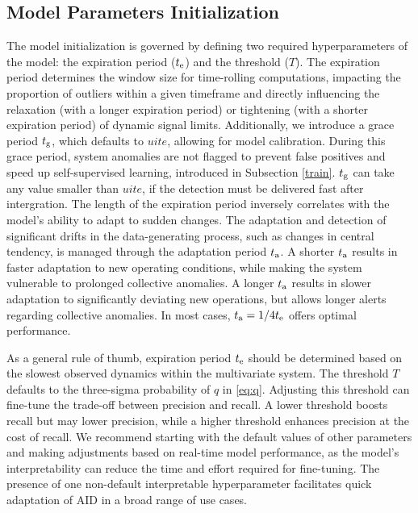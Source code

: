 \subsection{Model Parameters Initialization}\label{init}
The model initialization is governed by defining two required hyperparameters of the model: the expiration period ($t _{\text{e}}$) and the threshold ($T$). The expiration period determines the window size for time-rolling computations, impacting the proportion of outliers within a given timeframe and directly influencing the relaxation (with a longer expiration period) or tightening (with a shorter expiration period) of dynamic signal limits. Additionally, we introduce a grace period $t _{\text{g}}$, which defaults to $ui{t}{e}$, allowing for model calibration. During this grace period, system anomalies are not flagged to prevent false positives and speed up self-supervised learning, introduced in Subsection \ref{train}. $t _{\text{g}}$ can take any value smaller than $ui{t}{e}$, if the detection must be delivered fast after intergration. The length of the expiration period inversely correlates with the model's ability to adapt to sudden changes. The adaptation and detection of significant drifts in the data-generating process, such as changes in central tendency, is managed through the adaptation period $t _{\text{a}}$. A shorter $t _{\text{a}}$ results in faster adaptation to new operating conditions, while making the system vulnerable to prolonged collective anomalies. A longer $t _{\text{a}}$ results in slower adaptation to significantly deviating new operations, but allows longer alerts regarding collective anomalies. In most cases, $t _{\text{a}} = 1/4t _{\text{e}}$ offers optimal performance.

As a general rule of thumb, expiration period $t _{\text{e}}$ should be determined based on the slowest observed dynamics within the multivariate system. The threshold $T$ defaults to the three-sigma probability of $q$ in \eqref{eq:q}. Adjusting this threshold can fine-tune the trade-off between precision and recall. A lower threshold boosts recall but may lower precision, while a higher threshold enhances precision at the cost of recall. We recommend starting with the default values of other parameters and making adjustments based on real-time model performance, as the model's interpretability can reduce the time and effort required for fine-tuning. The presence of one non-default interpretable hyperparameter facilitates quick adaptation of AID in a broad range of use cases.

